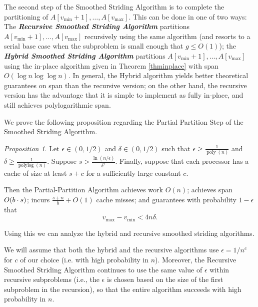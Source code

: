 \documentclass[sigconf, 10pt, nonacm]{acmart}
\DeclarePairedDelimiter{\paren}{(}{)}
\newcommand{\poly}{\operatorname{poly}}
\newcommand{\polylog}{\operatorname{polylog}}
\newcommand{\defn}[1]{{\textit{\textbf{\boldmath #1}}}}
\renewcommand{\paragraph}[1]{\vspace{0.09in}\noindent{\bf \boldmath #1.}}
\theoremstyle{remark}
\newtheorem{proposition}[thm]{Proposition}
\theoremstyle{remark}
\begin{document}
The second step of the Smoothed Striding Algorithm is to complete the
partitioning of $A[v_{\text{min}} + 1], \ldots, A[v_{\text{max}}]$. This can be done
in one of two ways: The \defn{Recursive Smoothed Striding Algorithm}
partitions $A[v_{\text{min}} + 1], \ldots, A[v_{\text{max}}]$ recursively using the
same algorithm (and resorts to a serial base case when the subproblem
is small enough that $g \le O(1)$); the \defn{Hybrid Smoothed Striding
  Algorithm} partitions $A[v_{\text{min}} + 1], \ldots, A[v_{\text{max}}]$ using the
in-place algorithm given in Theorem \ref{thminplace} with span $O(\log
n \log \log n)$. In general, the Hybrid algorithm yields better
theoretical guarantees on span than the recursive version; on the
other hand, the recursive version has the advantage that it is
simple to implement as fully in-place, and still achieves
polylogarithmic span. 


\paragraph{Algorithm Analysis} 
We prove the following proposition regarding the Partial Partition Step of the
Smoothed Striding Algorithm.
\begin{proposition}
  \label{prop:generalResult}
  Let $\epsilon \in (0, 1/2)$ and $\delta \in (0, 1/2)$ such that
  $\epsilon \ge \frac{1}{\poly(n)}$ and $\delta \ge
  \frac{1}{\polylog(n)}$. Suppose $s > \frac{\ln
    (n/\epsilon)}{\delta^2}$. Finally, suppose that each processor has
  a cache of size at least $s + c$ for a sufficiently large constant
  $c$.

  Then the Partial-Partition Algorithm achieves work $O(n)$; achieves
  span $O\paren*{b \cdot s}$; incurs $\frac{s+n}{b} + O(1)$ cache
  misses; and guarantees with probability $1 - \epsilon$ that
  $$v_{\text{max}}-v_{\text{min}} < 4 n \delta.$$
\end{proposition}

Using this we can analyze the hybrid and recursive smoothed striding algorithms.

We will assume that both the hybrid and the recursive algorithms use $\epsilon
= 1/n^c$ for $c$ of our choice (i.e. with high probability in $n$). Moreover,
the Recursive Smoothed Striding Algorithm continues to use the same value of
$\epsilon$ within recursive subproblems (i.e., the $\epsilon$ is chosen based
on the size of the first subproblem in the recursion), so that the entire
algorithm succeeds with high probability in $n$.
\end{document}
